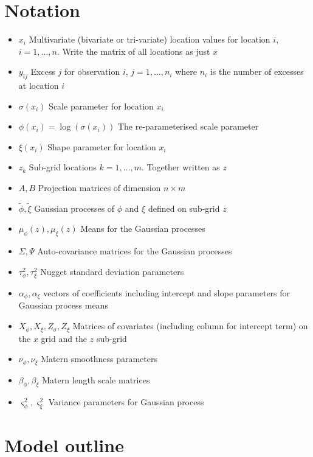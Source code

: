 \documentclass{article}
\begin{document}
\section{Notation}

\begin{itemize}
\item $x_i$ Multivariate (bivariate or tri-variate) location values for location $i$, $i = 1,\ldots, n$. Write the matrix of all locations as just $x$
\item $y_{ij}$ Excess $j$ for observation $i$, $j = 1,\ldots,n_i$ where $n_i$ is the number of excesses at location $i$
\item $\sigma(x_i)$ Scale parameter for location $x_i$
\item $\phi(x_i) = \log(\sigma(x_i))$ The re-parameterised scale parameter
\item $\xi(x_i)$ Shape parameter for location $x_i$
\item $z_k$ Sub-grid locations $k = 1, \ldots, m$. Together written as $z$
\item $A, B$ Projection matrices of dimension $n \times m$
\item $\tilde{\phi}, \tilde{\xi}$ Gaussian processes of $\phi$ and $\xi$ defined on sub-grid $z$
\item $\mu_\phi(z), \mu_\xi(z)$ Means for the Gaussian processes
\item $\Sigma, \Psi$ Auto-covariance matrices for the Gaussian processes
\item $\tau^2_\phi, \tau^2_\xi$ Nugget standard deviation parameters
\item $\alpha_\phi, \alpha_\xi$ vectors of coefficients including intercept and slope parameters for Gaussian process means
\item $X_\phi, X_\xi, Z_\sigma, Z_\xi$ Matrices of covariates (including column for intercept term) on the $x$ grid and the $z$ sub-grid
\item $\nu_\phi, \nu_\xi$ Matern smoothness parameters
\item $\beta_\phi, \beta_\xi$ Matern length scale matrices
\item $\varsigma^2_\phi, \varsigma^2_\xi$ Variance parameters for Gaussian process
\end{itemize}

\section{Model outline} \label{outline}
\end{document}
